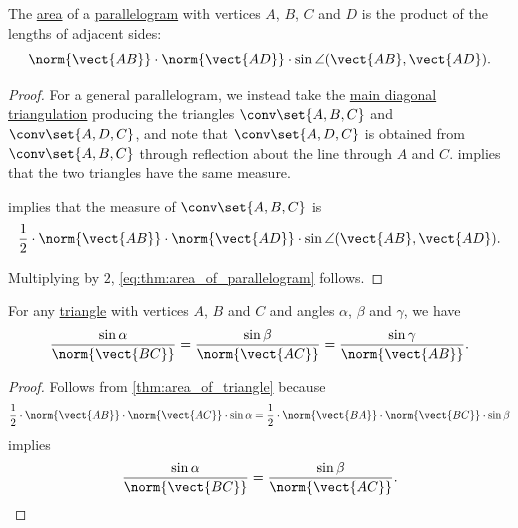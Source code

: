 \begin{proposition}\label{thm:area_of_parallelogram}
  The \hyperref[def:figure_area]{area} of a \hyperref[def:parallelogram]{parallelogram} with vertices \( A \), \( B \), \( C \) and \( D \) is the product of the lengths of adjacent sides:
  \begin{equation}\label{eq:thm:area_of_parallelogram}
    \norm{\vect{AB}} \cdot \norm{\vect{AD}} \cdot \sin\angle(\vect{AB}, \vect{AD}).
  \end{equation}
\end{proposition}
\begin{proof}
  For a general parallelogram, we instead take the \hyperref[thm:diagonal_trapezoid_triangulation]{main diagonal triangulation} producing the triangles \( \conv\set{ A, B, C } \) and \( \conv\set{ A, D, C } \), and note that \( \conv\set{ A, D, C } \) is obtained from \( \conv\set{ A, B, C } \) through reflection about the line through \( A \) and \( C \).  implies that the two triangles have the same measure.

   implies that the measure of \( \conv\set{ A, B, C } \) is
  \begin{equation*}
    \frac 1 2 \cdot \norm{\vect{AB}} \cdot \norm{\vect{AD}} \cdot \sin\angle(\vect{AB}, \vect{AD}).
  \end{equation*}

  Multiplying by \( 2 \), \eqref{eq:thm:area_of_parallelogram} follows.
\end{proof}

\begin{theorem}\label{thm:law_of_sines}
  For any \hyperref[def:triangle]{triangle} with vertices \( A \), \( B \) and \( C \) and angles \( \alpha \), \( \beta \) and \( \gamma \), we have
  \begin{equation}\label{eq:thm:law_of_sines}
    \frac {\sin \alpha} {\norm{\vect{BC}}}
    =
    \frac {\sin \beta} {\norm{\vect{AC}}}
    =
    \frac {\sin \gamma} {\norm{\vect{AB}}}.
  \end{equation}
\end{theorem}
\begin{proof}
  Follows from \cref{thm:area_of_triangle} because
  \begin{equation*}
    \frac 1 2 \cdot \norm{\vect{AB}} \cdot \norm{\vect{AC}} \cdot \sin \alpha
    =
    \frac 1 2 \cdot \norm{\vect{BA}} \cdot \norm{\vect{BC}} \cdot \sin \beta
  \end{equation*}
  implies
  \begin{equation*}
    \frac {\sin \alpha} {\norm{\vect{BC}}}
    =
    \frac {\sin \beta} {\norm{\vect{AC}}}.
  \end{equation*}
\end{proof}

